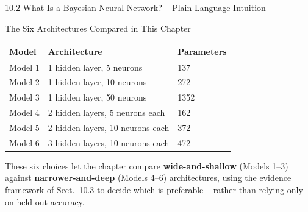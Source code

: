 \documentclass[aspectratio=169,10pt]{beamer}
\begin{document}
\begin{frame}[allowframebreaks]{10.2 What Is a Bayesian Neural Network? -- Plain-Language Intuition}
  \framebreak

  \begin{block}{The Six Architectures Compared in This Chapter}
    \begin{center}
    \begin{tabular}{lll}
      \toprule
      \textbf{Model} & \textbf{Architecture} & \textbf{Parameters} \\
      \midrule
      Model 1 & 1 hidden layer, 5 neurons   & 137 \\
      Model 2 & 1 hidden layer, 10 neurons  & 272 \\
      Model 3 & 1 hidden layer, 50 neurons  & 1352 \\
      Model 4 & 2 hidden layers, 5 neurons each  & 162 \\
      Model 5 & 2 hidden layers, 10 neurons each & 372 \\
      Model 6 & 3 hidden layers, 10 neurons each & 472 \\
      \bottomrule
    \end{tabular}
    \end{center}
    These six choices let the chapter compare \textbf{wide-and-shallow}
    (Models 1--3) against \textbf{narrower-and-deep} (Models 4--6)
    architectures, using the evidence framework of Sect.\ 10.3 to decide
    which is preferable -- rather than relying only on held-out accuracy.
  \end{block}

\end{frame}
\end{document}
